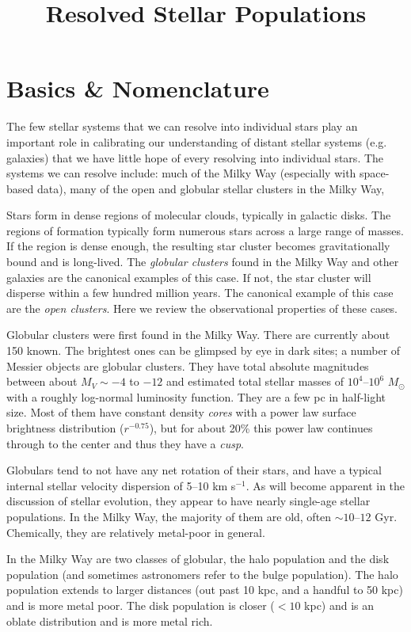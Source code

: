 \title{\bf Resolved Stellar Populations}

\section{Basics \& Nomenclature}

The few stellar systems that we can resolve into individual stars play
an important role in calibrating our understanding of distant stellar
systems (e.g. galaxies) that we have little hope of every resolving
into individual stars. The systems we can resolve include: much of the
Milky Way (especially with space-based data), many of the open and
globular stellar clusters in the Milky Way, 

Stars form in dense regions of molecular clouds, typically in galactic
disks. The regions of formation typically form numerous stars across a
large range of masses. If the region is dense enough, the resulting
star cluster becomes gravitationally bound and is long-lived. The {\it
  globular clusters} found in the Milky Way and other galaxies are the
canonical examples of this case. If not, the star cluster will
disperse within a few hundred million years. The canonical example of
this case are the {\it open clusters}. Here we review the
observational properties of these cases.

Globular clusters were first found in the Milky Way. There are
currently about 150 known. The brightest ones can be glimpsed by eye
in dark sites; a number of Messier objects are globular clusters. They
have total absolute magnitudes between about $M_V \sim -4$ to $-12$
and estimated total stellar masses of $10^4$--$10^6$ $M_\odot$ with a
roughly log-normal luminosity function. They are a few pc in
half-light size.  Most of them have constant density {\it cores} with
a power law surface brightness distribution ($r^{-0.75}$), but for
about 20\% this power law continues through to the center and thus
they have a {\it cusp}.

Globulars tend to not have any net rotation of their stars, and have a
typical internal stellar velocity dispersion of 5--10 km s$^{-1}$. As
will become apparent in the discussion of stellar evolution, they
appear to have nearly single-age stellar populations. In the Milky
Way, the majority of them are old, often $\sim 10$--$12$
Gyr. Chemically, they are relatively metal-poor in general.

In the Milky Way are two classes of globular, the halo population and
the disk population (and sometimes astronomers refer to the bulge
population). The halo population extends to larger distances (out past
10 kpc, and a handful to 50 kpc) and is more metal poor. The disk
population is closer ($< 10$ kpc) and is an oblate distribution and is
more metal rich. 


